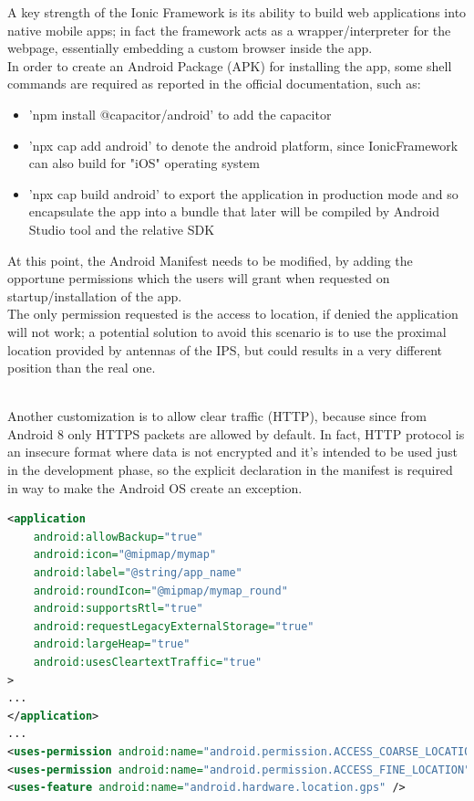 \documentclass[conference]{IEEEtran}
\begin{document}
A key strength of the Ionic Framework is its ability to build web applications into native mobile apps; in fact the framework acts as a wrapper/interpreter for the webpage, essentially embedding a custom browser inside the app.
\\
In order to create an Android Package (APK) for installing the app, some shell commands are required as reported in the official documentation, such as:
\begin{itemize}
    \item 'npm install @capacitor/android' to add the capacitor
    \item  'npx cap add android' to denote the android platform, since IonicFramework can also build for "iOS" operating system
    \item 'npx cap build android' to export the application in production mode and so encapsulate the app into a bundle that later will be compiled by Android Studio\cite{b11} tool and the relative SDK 
\end{itemize}


At this point, the Android Manifest needs to be modified, by adding the opportune permissions which the users will grant when requested on startup/installation of the app.
\\
The only permission requested is the access to location, if denied the application will not work; a potential solution to avoid this scenario is to use the proximal location provided by antennas of the IPS, but could results in a very different position than the real one.

\\
Another customization is to allow clear traffic (HTTP), because since from Android 8 only HTTPS packets are allowed by default.
In fact, HTTP protocol is an insecure format where data is not encrypted and it's intended to be used just in the development phase, so the explicit declaration in the manifest is required in way to make the Android OS create an exception.

\begin{lstlisting}[language=XML, caption=Snippet of Android Manifest]
<application
    android:allowBackup="true"
    android:icon="@mipmap/mymap"
    android:label="@string/app_name"
    android:roundIcon="@mipmap/mymap_round"
    android:supportsRtl="true"
    android:requestLegacyExternalStorage="true"
    android:largeHeap="true"
    android:usesCleartextTraffic="true"
>
...
</application>
...
<uses-permission android:name="android.permission.ACCESS_COARSE_LOCATION" />
<uses-permission android:name="android.permission.ACCESS_FINE_LOCATION" />
<uses-feature android:name="android.hardware.location.gps" />
        
\end{lstlisting}
\end{document}
